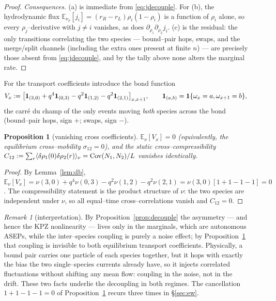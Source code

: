 \documentclass[11pt]{article}
\theoremstyle{plain}
\newtheorem{proposition}[theorem]{Proposition}
\theoremstyle{definition}
\theoremstyle{remark}
\newtheorem{remark}[theorem]{Remark}
\newcommand{\E}{\mathbb{E}}\newcommand{\PP}{\mathbb{P}}\newcommand{\dd}{\,\mathrm{d}}
\begin{document}
\begin{proof}
\emph{Consequences.} (a) is immediate from \eqref{eq:jdecouple}. For (b), the
hydrodynamic flux $\E_{\nu_\rho}[j_i]=(r_R-r_L)\rho_i(1-\rho_i)$ is a function of
$\rho_i$ alone, so every $\rho_j$--derivative with $j\ne i$ vanishes, as does
$\partial_{\rho_1}\partial_{\rho_2}j_i$. (c) is the residual: the only transitions
correlating the two species --- bound--pair hops, swaps, and the merge/split channels
(including the extra ones present at finite $n$) --- are precisely those absent from
\eqref{eq:jdecouple}, and by the tally above none alters the marginal rate.
\end{proof}

For the transport coefficients introduce the bond function
\begin{equation}\label{eq:Vdef}
  V_x:=\big[\mathbf 1_{(3,0)}+q^4\mathbf 1_{(0,3)}-q^2\mathbf 1_{(1,2)}-q^2\mathbf 1_{(2,1)}\big]_{x,x+1},
  \qquad \mathbf 1_{(a,b)}=\mathbf 1\{\omega_x=a,\omega_{x+1}=b\},
\end{equation}
the carr\'e du champ of the only events moving \emph{both} species across the bond
(bound--pair hops, sign $+$; swaps, sign $-$).

\begin{proposition}[vanishing cross coefficients]\label{prop:cross}
$\E_\nu[V_x]=0$ \textup{(}equivalently, the equilibrium cross--mobility
$\sigma_{12}=0$\textup{)}, and the static cross--compressibility
$C_{12}:=\sum_r\langle\delta\rho_1(0)\delta\rho_2(r)\rangle_\nu=\operatorname{Cov}(N_1,N_2)/L$
vanishes identically.
\end{proposition}
\begin{proof}
By Lemma~\ref{lem:db},
$\E_\nu[V_x]=\nu(3,0)+q^4\nu(0,3)-q^2\nu(1,2)-q^2\nu(2,1)=\nu(3,0)[1+1-1-1]=0$. The
compressibility statement is the product structure of $\nu$: the two species are
independent under $\nu$, so all equal--time cross--correlations vanish and $C_{12}=0$.
\end{proof}

\begin{remark}[interpretation]\label{rem:transport}
By Proposition~\ref{prop:decouple} the asymmetry --- and hence the KPZ nonlinearity ---
lives only in the marginals, which are autonomous ASEPs, while the inter--species
coupling is purely a noise effect; by Proposition~\ref{prop:cross} that coupling is
invisible to both equilibrium transport coefficients. Physically, a bound pair carries
one particle of each species together, but it hops with exactly the bias the two
single--species currents already have, so it injects correlated fluctuations without
shifting any mean flow: coupling in the noise, not in the drift. These two facts
underlie the decoupling in both regimes. The cancellation $1+1-1-1=0$ of
Proposition~\ref{prop:cross} recurs three times in \S\ref{sec:ew}.
\end{remark}
\end{document}
